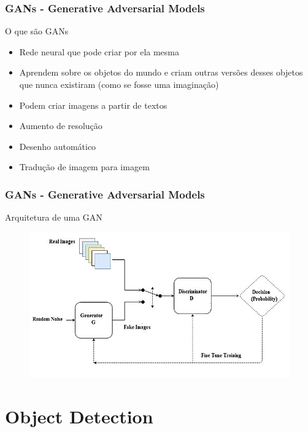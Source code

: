 \documentclass{beamer}
\begin{document}
\begin{frame}
		\frametitle{GANs - Generative Adversarial Models}
	\begin{block}{O que são GANs}
		\begin{itemize}
			\item Rede neural que pode criar por ela mesma
			\item Aprendem sobre os objetos do mundo e criam outras versões desses
			objetos que nunca existiram (como se fosse uma imaginação)
			\item Podem criar imagens a partir de textos
			\item Aumento de resolução
			\item Desenho automático
			\item Tradução de imagem para imagem
		\end{itemize}
	\end{block}
\end{frame}
\begin{frame}
	\frametitle{GANs - Generative Adversarial Models}
	\begin{block}{Arquitetura de uma GAN}
		\begin{figure}
			\centering
			\includegraphics[width=0.7\linewidth]{figures/GAN_achi}
		\end{figure}
		\href{https://developers.google.com/machine-learning/gan/gan_structure?hl=pt-br}{} 
	\end{block}
\end{frame}


\section{Object Detection}
\end{document}
